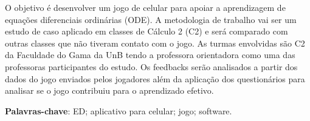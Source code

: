 \begin{resumo}

	O objetivo é desenvolver um jogo de celular para apoiar a aprendizagem de equações diferenciais ordinárias (ODE). A metodologia de trabalho vai ser um estudo de caso aplicado em classes de Cálculo 2 (C2) e será comparado com outras classes que não tiveram contato com o jogo. As turmas envolvidas são C2 da Faculdade do Gama da UnB tendo a professora orientadora como uma das professoras participantes do estudo. Os feedbacks serão analisados a partir dos dados do jogo enviados pelos jogadores além da aplicação dos questionários para analisar se o jogo contribuiu para o aprendizado efetivo.
	
\begin{comment}
 Com a qualidade de ensino de matemática baixa e contra os métodos muito
 tradicionais de ensino nas salas de aula, resolveu-se desenvolver um 
 aplicativo para celular (iOS e Android) que seja um jogo para o suporte de 
 ensino de equações diferenciais (ED). Será realizada uma pesquisa descritiva
 para o levantamento bibliográfico das características que deverão estar presentes
 no software para dar auxílio a alunos com TDAH junto de técnicas de gamificação 
 para tentar deixar o aprendizado mais prazeroso.
\end{comment}
  
 \begin{comment}
 O resumo deve ressaltar o objetivo, o método, os resultados e as conclusões 
 do documento. A ordem e a extensão
 destes itens dependem do tipo de resumo (informativo ou indicativo) e do
 tratamento que cada item recebe no documento original. O resumo deve ser
 precedido da referência do documento, com exceção do resumo inserido no
 próprio documento. (\ldots) As palavras-chave devem figurar logo abaixo do
 resumo, antecedidas da expressão Palavras-chave:, separadas entre si por
 ponto e finalizadas também por ponto. O texto pode conter no mínimo 150 e 
 no máximo 500 palavras, é aconselhável que sejam utilizadas 200 palavras. 
 E não se separa o texto do resumo em parágrafos.
 \end{comment}

 \vspace{\onelineskip}
    
 \noindent
 \textbf{Palavras-chave}: ED; aplicativo para celular; jogo; software.
\end{resumo}

